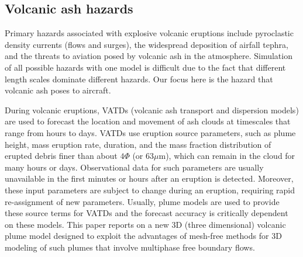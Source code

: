 \documentclass[journal abbreviation, manuscript]{copernicus}
\begin{document}
\introduction  %
\subsection{Volcanic ash hazards}
Primary hazards associated with explosive volcanic eruptions include pyroclastic density currents (flows and surges), the widespread deposition of airfall tephra, and the threats to aviation posed by volcanic ash in the atmosphere.
Simulation of all possible hazards with one model is difficult due to the fact that different length scales dominate different hazards. Our focus here is the hazard that volcanic ash poses to aircraft. 

During volcanic eruptions, VATDs (volcanic ash transport and dispersion models) are used to forecast the location and movement of ash clouds at timescales that range from hours to days. VATDs use eruption source parameters, such as plume height, mass eruption rate, duration, and the mass fraction distribution of erupted debris finer than about $4 \Phi$ (or $63  \mu$m), which can remain in the cloud for many hours or days. Observational data for such parameters are usually unavailable in the first minutes or hours after an eruption is detected. Moreover, these input parameters are subject to change during an eruption, requiring rapid re-assignment of new parameters. Usually, plume models are used to provide these source terms for VATDs and the forecast accuracy is critically dependent on these models. This paper reports on a new 3D (three dimensional) volcanic plume model designed to exploit the advantages of mesh-free methods for 3D modeling of such plumes that involve multiphase free boundary flows.

\end{document}
